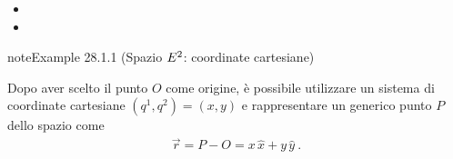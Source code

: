 \documentclass[letterpaper,10pt,italian]{jupyterBook}
\begin{document}
\sphinxAtStartPar
{}
\begin{itemize}
\item {} 
\sphinxAtStartPar
{}

\item {} 
\sphinxAtStartPar
{}

\end{itemize}
\label{ch/vector-calculus/geometry:example-1}
\begin{sphinxadmonition}{note}{Example 28.1.1 (Spazio \protect\(E^2\protect\): coordinate cartesiane)}



\sphinxAtStartPar
Dopo aver scelto il punto \(O\) come origine, è possibile utilizzare un sistema di coordinate cartesiane \((q^1, q^2) = (x,y)\) e rappresentare un generico punto \(P\) dello spazio come
\begin{equation*}
\begin{split}\vec{r} = P - O = x \, \hat{x} + y \, \hat{y} \ .\end{split}
\end{equation*}\end{sphinxadmonition}
\label{ch/vector-calculus/geometry:example-2}
\end{document}
